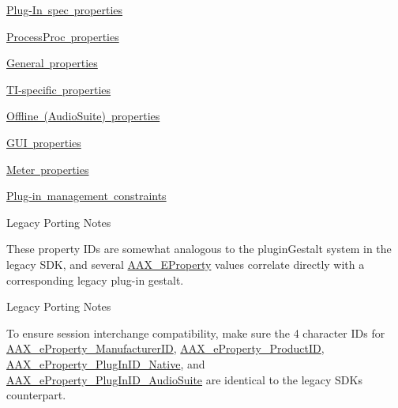 \begin{DoxyItemize}
\item \mbox{\hyperlink{a00662_a13e384f22825afd3db6d68395b79ce0dadc0be12e13a5dcdf799f3405b9da27c9}{Plug-\/\+In spec properties}}
\item \mbox{\hyperlink{a00662_a13e384f22825afd3db6d68395b79ce0da9a78445174f219014332c67af3b1eda6}{Process\+Proc properties}}
\item \mbox{\hyperlink{a00662_a13e384f22825afd3db6d68395b79ce0da363690ab5ed1b5ee3666eda48e2b2500}{General properties}}
\item \mbox{\hyperlink{a00662_a13e384f22825afd3db6d68395b79ce0da3e5b289333ba49f5a33de40d89fa4ade}{T\+I-\/specific properties}}
\item \mbox{\hyperlink{a00662_a13e384f22825afd3db6d68395b79ce0dae774ad8d49f9d021fc39e7d9c6f08070}{Offline (Audio\+Suite) properties}}
\item \mbox{\hyperlink{a00662_a13e384f22825afd3db6d68395b79ce0da045b9ab3f8a4f63f9c62e1dffc1952aa}{G\+UI properties}}
\item \mbox{\hyperlink{a00662_a13e384f22825afd3db6d68395b79ce0daa2aac06f000e364af20507103d6b0943}{Meter properties}}
\item \mbox{\hyperlink{a00662_a13e384f22825afd3db6d68395b79ce0da16278ad29e89edd358ded16a34db4326}{Plug-\/in management constraints}}

\begin{DoxyRefDesc}{Legacy Porting Notes}
\item[\mbox{\hyperlink{a00787__porting_notes000039}{Legacy Porting Notes}}]These property I\+Ds are somewhat analogous to the plugin\+Gestalt system in the legacy S\+DK, and several \mbox{\hyperlink{a00662_a13e384f22825afd3db6d68395b79ce0d}{A\+A\+X\+\_\+\+E\+Property}} values correlate directly with a corresponding legacy plug-\/in gestalt.\end{DoxyRefDesc}


\begin{DoxyRefDesc}{Legacy Porting Notes}
\item[\mbox{\hyperlink{a00787__porting_notes000040}{Legacy Porting Notes}}]To ensure session interchange compatibility, make sure the 4 character I\+Ds for \mbox{\hyperlink{a00662_a13e384f22825afd3db6d68395b79ce0da996465cca29a2a15291d1c788ac5728c}{A\+A\+X\+\_\+e\+Property\+\_\+\+Manufacturer\+ID}}, \mbox{\hyperlink{a00662_a13e384f22825afd3db6d68395b79ce0da3a41fcdff5af1a4fd19dcbca7b1ba6f3}{A\+A\+X\+\_\+e\+Property\+\_\+\+Product\+ID}}, \mbox{\hyperlink{a00662_a13e384f22825afd3db6d68395b79ce0da89ca3dd6e96895cda14976c1b1ceb826}{A\+A\+X\+\_\+e\+Property\+\_\+\+Plug\+In\+I\+D\+\_\+\+Native}}, and \mbox{\hyperlink{a00662_a13e384f22825afd3db6d68395b79ce0dad3344696b8298a8b254add3d039ea927}{A\+A\+X\+\_\+e\+Property\+\_\+\+Plug\+In\+I\+D\+\_\+\+Audio\+Suite}} are identical to the legacy S\+DK\textquotesingle{}s counterpart.\end{DoxyRefDesc}


\end{DoxyItemize}
